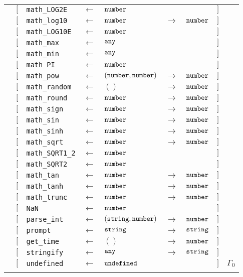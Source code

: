 \begin{tabular}[fragile]{lllllllll}
& $[$ & \texttt{math\_LOG2E} & $\leftarrow$  & $\texttt{number}$ & & & $]$ \\
& $[$ & \texttt{math\_log10} & $\leftarrow$  & $\texttt{number}$ & $\rightarrow$ & $\texttt{number}$ & $]$ \\
& $[$ & \texttt{math\_LOG10E} & $\leftarrow$  & $\texttt{number}$ & & & $]$ \\
& $[$ & \texttt{math\_max} & $\leftarrow$  & $\texttt{any}$ & & & $]$ \\
& $[$ & \texttt{math\_min} & $\leftarrow$  & $\texttt{any}$ & & & $]$ \\
& $[$ & \texttt{math\_PI} & $\leftarrow$  & $\texttt{number}$ & & & $]$ \\
& $[$ & \texttt{math\_pow} & $\leftarrow$  & $(\texttt{number}, \texttt{number})$ & $\rightarrow$ & $\texttt{number}$ & $]$ \\
& $[$ & \texttt{math\_random} & $\leftarrow$  & $()$ & $\rightarrow$ & $\texttt{number}$ & $]$ \\
& $[$ & \texttt{math\_round} & $\leftarrow$  & $\texttt{number}$ & $\rightarrow$ & $\texttt{number}$ & $]$ \\
& $[$ & \texttt{math\_sign} & $\leftarrow$  & $\texttt{number}$ & $\rightarrow$ & $\texttt{number}$ & $]$ \\
& $[$ & \texttt{math\_sin} & $\leftarrow$  & $\texttt{number}$ & $\rightarrow$ & $\texttt{number}$ & $]$ \\
& $[$ & \texttt{math\_sinh} & $\leftarrow$  & $\texttt{number}$ & $\rightarrow$ & $\texttt{number}$ & $]$ \\
& $[$ & \texttt{math\_sqrt} & $\leftarrow$  & $\texttt{number}$ & $\rightarrow$ & $\texttt{number}$ & $]$ \\
& $[$ & \texttt{math\_SQRT1\_2} & $\leftarrow$  & $\texttt{number}$ & & & $]$ \\
& $[$ & \texttt{math\_SQRT2} & $\leftarrow$  & $\texttt{number}$ & & & $]$ \\
& $[$ & \texttt{math\_tan} & $\leftarrow$  & $\texttt{number}$ & $\rightarrow$ & $\texttt{number}$ & $]$ \\
& $[$ & \texttt{math\_tanh} & $\leftarrow$  & $\texttt{number}$ & $\rightarrow$ & $\texttt{number}$ & $]$ \\
& $[$ & \texttt{math\_trunc} & $\leftarrow$  & $\texttt{number}$ & $\rightarrow$ & $\texttt{number}$ & $]$ \\
& $[$ & \texttt{NaN} & $\leftarrow$  & $\texttt{number}$ & & & $]$ \\
& $[$ & \texttt{parse\_int} & $\leftarrow$  & $(\texttt{string}, \texttt{number})$ & $\rightarrow$ & $\texttt{number}$ & $]$ \\
& $[$ & \texttt{prompt} & $\leftarrow$  & $\texttt{string}$ & $\rightarrow$ & $\texttt{string}$ & $]$ \\
& $[$ & \texttt{get\_time} & $\leftarrow$  & $()$ & $\rightarrow$ & $\texttt{number}$ & $]$ \\
& $[$ & \texttt{stringify} & $\leftarrow$  & $\texttt{any}$ & $\rightarrow$ & $\texttt{string}$ & $]$ \\
& $[$ & \texttt{undefined} & $\leftarrow$  & $\texttt{undefined}$ & & & $]$ & $\Gamma_0$ \\
& \end{tabular}

